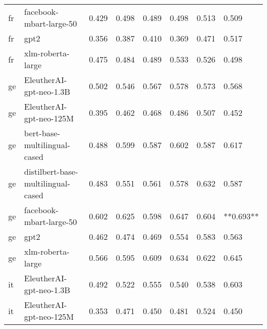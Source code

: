 \begin{tabular}{llllllll}
      fr &            facebook-mbart-large-50 & 0.429 &                     0.498 &                 0.489 &                  0.498 &                                   0.513 &     0.509 \\
      fr &                               gpt2 & 0.356 &                     0.387 &                 0.410 &                  0.369 &                                   0.471 &     0.517 \\
      fr &                  xlm-roberta-large & 0.475 &                     0.484 &                 0.489 &                  0.533 &                                   0.526 &     0.498 \\
      ge &            EleutherAI-gpt-neo-1.3B & 0.502 &                     0.546 &                 0.567 &                  0.578 &                                   0.573 &     0.568 \\
      ge &            EleutherAI-gpt-neo-125M & 0.395 &                     0.462 &                 0.468 &                  0.486 &                                   0.507 &     0.452 \\
      ge &       bert-base-multilingual-cased & 0.488 &                     0.599 &                 0.587 &                  0.602 &                                   0.587 &     0.617 \\
      ge & distilbert-base-multilingual-cased & 0.483 &                     0.551 &                 0.561 &                  0.578 &                                   0.632 &     0.587 \\
      ge &            facebook-mbart-large-50 & 0.602 &                     0.625 &                 0.598 &                  0.647 &                                   0.604 & **0.693** \\
      ge &                               gpt2 & 0.462 &                     0.474 &                 0.469 &                  0.554 &                                   0.583 &     0.563 \\
      ge &                  xlm-roberta-large & 0.566 &                     0.595 &                 0.609 &                  0.634 &                                   0.622 &     0.645 \\
      it &            EleutherAI-gpt-neo-1.3B & 0.492 &                     0.522 &                 0.555 &                  0.540 &                                   0.538 &     0.603 \\
      it &            EleutherAI-gpt-neo-125M & 0.353 &                     0.471 &                 0.450 &                  0.481 &                                   0.524 &     0.450 \\

\end{tabular}
